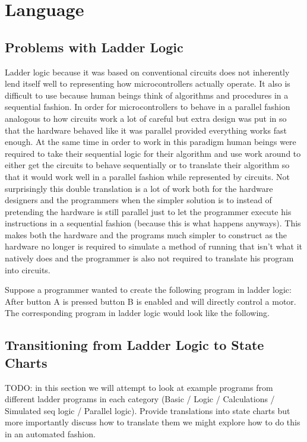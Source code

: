 \chapter{Language}
\section{Problems with Ladder Logic}
Ladder logic because it was based on conventional circuits does not inherently lend itself well to representing how microcontrollers actually operate. It also is difficult to use because human beings think of algorithms and procedures in a sequential fashion. In order for microcontrollers to behave in a parallel fashion analogous to how circuits work a lot of careful but extra design was put in so that the hardware behaved like it was parallel provided everything works fast enough. At the same time in order to work in this paradigm human beings were required to take their sequential logic for their algorithm and use work around to either get the circuits to behave sequentially or to translate their algorithm so that it would work well in a parallel fashion while represented by circuits. Not surprisingly this double translation is a lot of work both for the hardware designers and the programmers when the simpler solution is to instead of pretending the hardware is still parallel just to let the programmer execute his instructions in a sequential fashion (because this is what happens anyways). This makes both the hardware and the programs much simpler to construct as the hardware no longer is required to simulate a method of running that isn't what it natively does and the programmer is also not required to translate his program into circuits.

Suppose a programmer wanted to create the following program in ladder logic: After button A is pressed button B is enabled and will directly control a motor. The corresponding program in ladder logic would look like the following.



\section{Transitioning from Ladder Logic to State Charts}
TODO: in this section we will attempt to look at example programs from different ladder programs in each category (Basic / Logic / Calculations / Simulated seq logic / Parallel logic). Provide translations into state charts but more importantly discuss how to translate them we might explore how to do this in an automated fashion.

